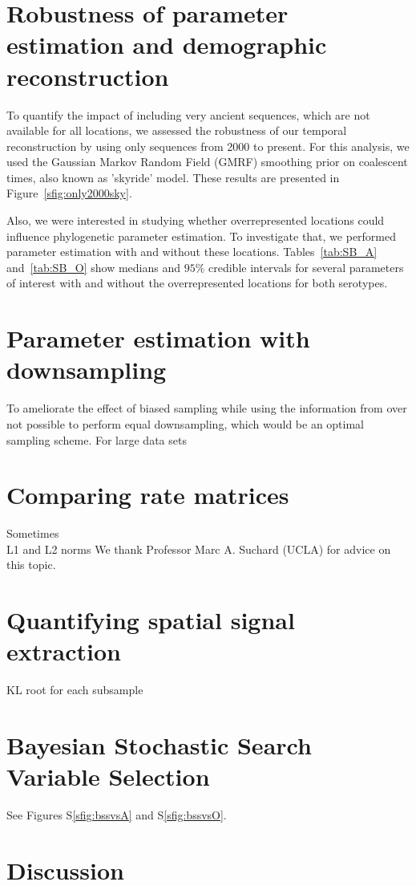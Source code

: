 \documentclass[a4paper,10pt]{article}
\begin{document}
\section{Robustness of parameter estimation and demographic reconstruction}
To quantify the impact of including very ancient sequences, which are not available for all locations, we assessed the robustness of our temporal reconstruction by using only sequences from 2000 to present.
For this analysis, we used the Gaussian Markov Random Field (GMRF) smoothing prior on coalescent times, also known as 'skyride' model.
These results are presented in Figure~\ref{sfig:only2000sky}.

Also, we were interested in studying whether overrepresented locations could influence phylogenetic parameter estimation.
To investigate that, we performed parameter estimation with and without these locations.
Tables~\ref{tab:SB_A} and~\ref{tab:SB_O} show medians and $95 \%$ credible intervals for several parameters of interest with and without the overrepresented locations
for both serotypes.
\section{Parameter estimation with downsampling}
To ameliorate the effect of biased sampling while using the information from over 
not possible to perform equal downsampling, which would be an optimal sampling scheme. For large data sets \cite{fluPNAS}
\section{Comparing rate matrices}
Sometimes \\
L1 and L2 norms
We thank Professor Marc A. Suchard (UCLA) for advice on this topic.\\
\section{Quantifying spatial signal extraction}
KL root for each subsample \cite{KL}
\section{Bayesian Stochastic Search Variable Selection}
See Figures S\ref{sfig:bssvsA} and S\ref{sfig:bssvsO}. 
\section{Discussion}
\end{document}
